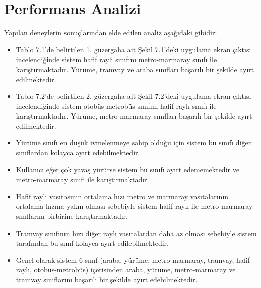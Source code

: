 \chapter{Performans Analizi}

Yapılan deneylerin sonuçlarından elde edilen analiz aşağıdaki gibidir:
\begin{itemize}
    \item Tablo 7.1'de belirtilen 1. güzergaha ait Şekil 7.1'deki uygulama ekran çıktısı incelendiğinde sistem hafif raylı sınıfını metro-marmaray sınıfı ile karıştırmaktadır. Yürüme, tramvay ve araba sınıfları başarılı bir şekilde ayırt edilmektedir.
    \item Tablo 7.2'de belirtilen 2. güzergaha ait Şekil 7.2'deki uygulama ekran çıktısı incelendiğinde sistem otobüs-metrobüs sınıfını hafif raylı sınıfı ile karıştırmaktadır. Yürüme, metro-marmaray sınıfları başarılı bir şekilde ayırt edilmektedir.
    \item Yürüme sınıfı en düşük ivmelenmeye sahip olduğu için sistem bu sınıfı diğer sınıflardan kolayca ayırt edebilmektedir.
    \item Kullanıcı eğer çok yavaş yürürse sistem bu sınıfı ayırt edememektedir ve metro-marmaray sınıfı ile karıştırmaktadır.
    \item Hafif raylı vasıtasının ortalama hızı metro ve marmaray vasıtalarının ortalama hızına yakın olması sebebiyle sistem hafif raylı ile metro-marmaray sınıflarını birbirine karıştırmaktadır.
    \item Tramvay sınıfının hızı diğer raylı vasıtalardan daha az olması sebebiyle sistem tarafından bu sınıf kolayca ayırt edilebilmektedir.
    \item Genel olarak sistem 6 sınıf (araba, yürüme, metro-marmaray, tramvay, hafif raylı, otobüs-metrobüs) içerisinden araba, yürüme, metro-marmaray ve tramvay sınıflarını başarılı bir şekilde ayırt edebilmektedir.
\end{itemize}

